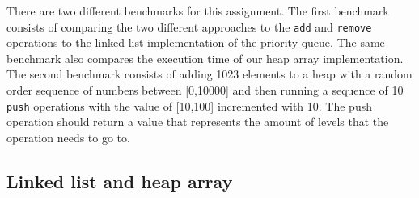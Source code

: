 \documentclass[a4paper,11pt]{article}
\begin{document}
    There are two different benchmarks for this assignment. The first benchmark consists of comparing the two different approaches to the \texttt{add} and \texttt{remove} operations to the linked list implementation of the priority queue. The same benchmark also compares the execution time of our heap array implementation. The second benchmark consists of adding 1023 elements to a heap with a random order sequence of numbers between [0,10000] and then running a sequence of 10 \texttt{push} operations with the value of [10,100] incremented with 10. The push operation should return a value that represents the amount of levels that the operation needs to go to.
    
    \subsection*{Linked list and heap array}
\end{document}
